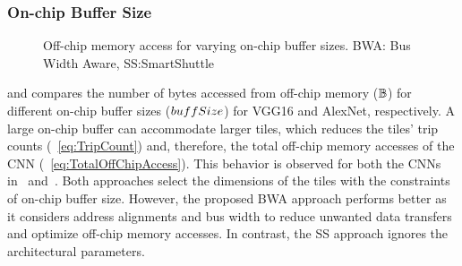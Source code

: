 \subsubsection{On-chip Buffer Size}
\begin{figure}[htb]
	\centering
	\hfil
	\hfil
	\caption{Off-chip memory access for varying on-chip buffer sizes. BWA: Bus Width Aware, SS:SmartShuttle}
	\label{fig:EffectOfVaryingOnChipBuffer}
	\vspace{-1.0em}
\end{figure}
 and  compares the number of bytes accessed from off-chip memory ($\mathbb{B}$) for different on-chip buffer sizes ($buffSize$) for VGG16 and AlexNet, respectively. A large on-chip buffer can accommodate larger tiles, which reduces the tiles' trip counts (~\eqref{eq:TripCount}) and, therefore, the total off-chip memory accesses of the CNN (~\eqref{eq:TotalOffChipAccess}). This behavior is observed for both the CNNs in~ and~. Both approaches select the dimensions of the tiles with the constraints of on-chip buffer size. However, the proposed BWA approach performs better as it considers address alignments and bus width to reduce unwanted data transfers and optimize off-chip memory accesses. In contrast, the SS approach ignores the architectural parameters.
